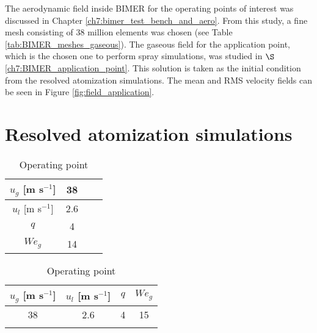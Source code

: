 The aerodynamic field inside BIMER for the operating points of interest was discussed in Chapter \ref{ch7:bimer_test_bench_and_aero}. From this study, a fine mesh consisting of 38 million elements was chosen (see Table \ref{tab:BIMER_meshes_gaseous}). The gaseous field for the application point, which is the chosen one to perform spray simulations, was studied in $\S$\ref{ch7:BIMER_application_point}. This solution is taken as the initial condition from the resolved atomization simulations. The mean and RMS velocity fields can be seen in Figure \ref{fig:field_application}. 





\section{Resolved atomization simulations}
\label{ch8:resolved_atomization_simulations}



\begin{table}[!h]
\centering
\caption{Operating point}
\begin{tabular}{cccc}
\thickhline
$u_g$ [m s$^{-1}$] &  38 \\
\hline
$u_l$ [m s$^{-1}$] &  2.6 \\
\hline
\hline
$q$ & 4 \\ %
\hline
$We_g$ & 14 \\
\hline
\end{tabular}
\label{tab:bimer_sps_operating_point}
\end{table}

\begin{table}[!h]
\centering
\caption{Operating point}
\begin{tabular}{cccc}
\thickhline
$u_g$ [m s$^{-1}$] &  $u_l$ [m s$^{-1}$] & $q$ &  $We_g$  \\
\hline
38 &  2.6 & 4 & 15 \\
\thickhline
\end{tabular}
\label{tab:bimer_sps_operating_point}
\end{table}




